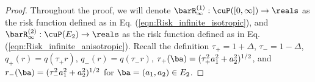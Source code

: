\documentclass[11pt]{article}
\newtheorem{remark}{Remark}[section]
\begin{document}
\begin{proof}


Throughout the proof, we will denote $\barR_\infty^{(1)}: \cuP([0, \infty]) \to \reals$ as the risk function defined as in Eq. (\ref{eqn:Risk_infinite_isotropic}), and $\barR_\infty^{(2)}: \cuP(E_2) \to \reals$ as the risk function defined as in Eq. (\ref{eqn:Risk_infinite_anisotropic}). Recall the definition $\tau_{+} = 1 + \Delta$, $\tau_{-} = 1 - \Delta$, $q_{+}(r) = q(\tau_{+} r)$, $q_{-}(r) = q(\tau_{-} r)$, $r_+(\ba) = (\tau_{+}^2 a_1^2 + a_2^2)^{1/2}$, and $r_-(\ba) = (\tau_{-}^2 a_1^2 + a_2^2)^{1/2}$ for $\ba = (a_1, a_2) \in E_2$. 




\end{proof}
\end{document}
